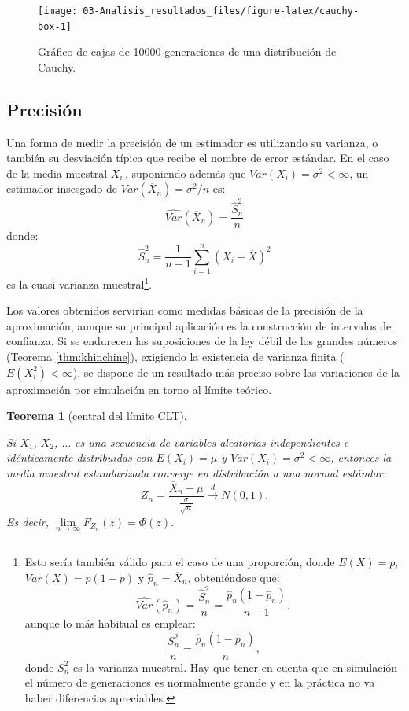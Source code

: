 \documentclass[
]{book}
\theoremstyle{break}
\newtheorem{theorem}{Teorema}[chapter]
\theoremstyle{nonumberplain}
\begin{document}
\begin{figure}[!htb]

{\centering \texttt{[image: 03-Analisis\_resultados\_files/figure-latex/cauchy-box-1]} 

}

\caption{Gráfico de cajas de 10000 generaciones de una distribución de Cauchy.}\label{fig:cauchy-box}
\end{figure}

\hypertarget{precisiuxf3n}{%
\subsection{Precisión}\label{precisiuxf3n}}

Una forma de medir la precisión de un estimador es utilizando su varianza, o también su desviación típica que recibe el nombre de error estándar.
En el caso de la media muestral \(\overline{X}_{n}\), suponiendo además que \(Var\left( X_{i}\right) = \sigma^{2}<\infty\), un estimador
insesgado de \(Var\left( \overline{X}_{n}\right) =\sigma ^{2}/n\) es:
\[\widehat{Var}\left( \overline{X}_{n}\right) = \frac{\widehat{S}_n^{2}}{n}\]
donde:
\[\widehat{S}_{n}^{2}=\dfrac{1}{n-1}\sum\limits_{i=1}^{n}\left( X_{i}-
\overline{X}\right) ^{2}\]
es la cuasi-varianza muestral\footnote{Esto sería también válido para el caso de una proporción, donde \(E(X) = p\), \(Var(X) = p(1-p)\) y \(\hat{p}_{n} = \overline{X}_{n}\), obteniéndose que: \[\widehat{Var}\left( \hat{p}_{n}\right) = \frac{\widehat{S}_n^{2}}{n} = \frac{\hat{p}_{n}(1-\hat{p}_{n})}{n-1},\] aunque lo más habitual es emplear: \[\frac{S_n^{2}}{n} = \frac{\hat{p}_{n}(1-\hat{p}_{n})}{n},\]
  donde \(S_n^{2}\) es la varianza muestral. Hay que tener en cuenta que en simulación el número de generaciones es normalmente grande y en la práctica no va haber diferencias apreciables.}.

Los valores obtenidos servirían como medidas básicas de la precisión de la aproximación, aunque su principal aplicación es la construcción de intervalos de confianza.
Si se endurecen las suposiciones de la ley débil de los grandes números (Teorema \ref{thm:khinchine}), exigiendo la existencia de varianza finita (\(E\left( X_{i}^2 \right) < \infty\)), se dispone de un resultado más preciso sobre las variaciones de la aproximación por simulación en torno al límite teórico.

\begin{theorem}[central del límite CLT]
\protect\hypertarget{thm:tcl}{}\label{thm:tcl}

Si \(X_{1}\), \(X_{2}\), \(\ldots\) es una secuencia de variables aleatorias independientes e idénticamente distribuidas con \(E\left( X_{i}\right) =\mu\) y
\(Var\left( X_{i}\right) = \sigma ^{2}<\infty\), entonces la media muestral estandarizada converge en distribución a una normal estándar:
\[Z_{n}=\frac{\overline{X}_{n}-\mu }{\frac{\sigma }{\sqrt{n}}}
\overset{d}{ \longrightarrow } N(0,1).\]
Es decir, \(\lim\limits_{n\rightarrow \infty }F_{Z_{n}}(z)=\Phi (z)\).
\end{theorem}
\end{document}
